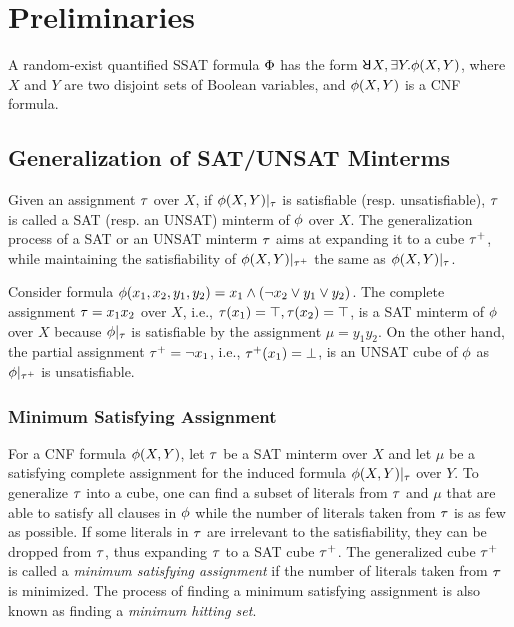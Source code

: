 \section{Preliminaries}
\label{sect:ressat-preliminaries}

A random-exist quantified SSAT formula $\Phi$ has the form $\random{} X,\exists Y.\pf(X,Y)$,
where $X$ and $Y$ are two disjoint sets of Boolean variables,
and $\phi(X,Y)$ is a CNF formula.

\subsection{Generalization of SAT/UNSAT Minterms}
\label{sect:ressat-generalize}

Given an assignment $\tau$ over $X$,
if $\phi(X,Y)|_{\tau}$ is satisfiable (resp. unsatisfiable),
$\tau$ is called a SAT (resp. an UNSAT) minterm of $\phi$ over $X$.
The generalization process of a SAT or an UNSAT minterm $\tau$ aims at expanding it to a cube $\tau^+$,
while maintaining the satisfiability of $\phi(X,Y)|_{\tau^+}$ the same as $\phi(X,Y)|_{\tau}$.
\begin{example}
    \label{ex:ressat-assign}
    Consider formula $\phi(x_1,x_2,y_1,y_2)=x_1 \land (\lnot x_2 \lor y_1 \lor y_2)$.
    The complete assignment $\tau = x_1 x_2$ over $X$, i.e., $\tau(x_1)=\top, \tau(x_2)=\top$,
    is a SAT minterm of $\phi$ over $X$ because $\phi|_{\tau}$ is satisfiable by the assignment $\mu = y_1y_2$.
    On the other hand, the partial assignment $\tau^+ = \lnot x_1$, i.e., $\tau^+(x_1)=\bot$,
    is an UNSAT cube of $\phi$ as $\phi|_{\tau^+}$ is unsatisfiable.
\end{example}

\subsubsection{Minimum Satisfying Assignment}
For a CNF formula $\phi(X,Y)$,
let $\tau$ be a SAT minterm over $X$ and let $\mu$ be a satisfying complete assignment for the induced formula $\phi(X,Y)|_{\tau}$ over $Y$.
To generalize $\tau$ into a cube, one can find a subset of literals from $\tau$ and $\mu$ that are able to satisfy all clauses in $\phi$ while the number of literals taken from $\tau$ is as few as possible.
If some literals in $\tau$ are irrelevant to the satisfiability,
they can be dropped from $\tau$, thus expanding $\tau$ to a SAT cube $\tau^+$.
The generalized cube $\tau^+$ is called a \textit{minimum satisfying assignment} if the number of literals taken from $\tau$ is minimized.
The process of finding a minimum satisfying assignment is also known as finding a \textit{minimum hitting set}.

